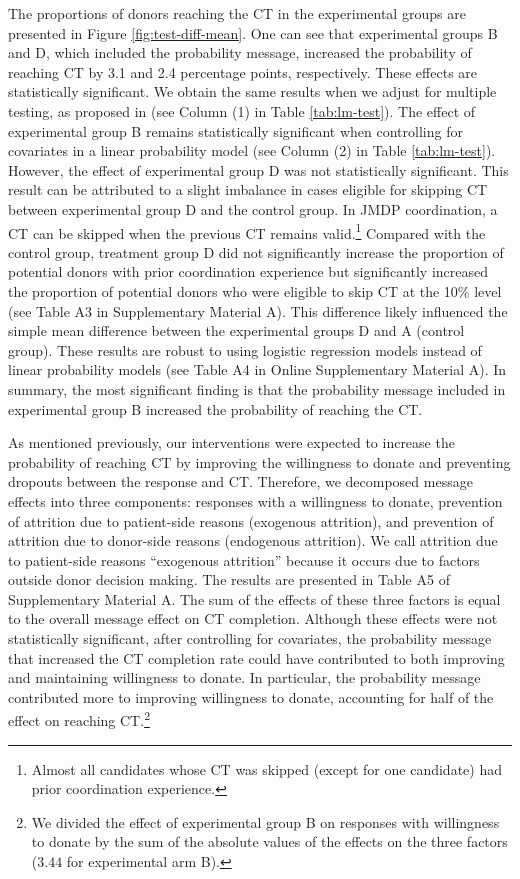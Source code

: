 \documentclass[12pt, a4paper]{article}
\begin{document}
The proportions of donors reaching the CT in the experimental groups are presented in Figure \ref{fig:test-diff-mean}. One can see that experimental groups B and D, which included the probability message, increased the probability of reaching CT by 3.1 and 2.4 percentage points, respectively. These effects are statistically significant. We obtain the same results when we adjust for multiple testing, as proposed in \citet{List2019} (see Column (1) in Table \ref{tab:lm-test}). The effect of experimental group B remains statistically significant when controlling for covariates in a linear probability model (see Column (2) in Table \ref{tab:lm-test}). However, the effect of experimental group D was not statistically significant. This result can be attributed to a slight imbalance in cases eligible for skipping CT between experimental group D and the control group. In JMDP coordination, a CT can be skipped when the previous CT remains valid.\footnote{Almost all candidates whose CT was skipped (except for one candidate) had prior coordination experience.} Compared with the control group, treatment group D did not significantly increase the proportion of potential donors with prior coordination experience but significantly increased the proportion of potential donors who were eligible to skip CT at the 10\% level (see Table A3 in Supplementary Material A). This difference likely influenced the simple mean difference between the experimental groups D and A (control group). These results are robust to using logistic regression models instead of linear probability models (see Table A4 in Online Supplementary Material A). In summary, the most significant finding is that the probability message included in experimental group B increased the probability of reaching the CT.

As mentioned previously, our interventions were expected to increase the probability of reaching CT by improving the willingness to donate and preventing dropouts between the response and CT. Therefore, we decomposed message effects into three components: responses with a willingness to donate, prevention of attrition due to patient-side reasons (exogenous attrition), and prevention of attrition due to donor-side reasons (endogenous attrition). We call attrition due to patient-side reasons ``exogenous attrition'' because it occurs due to factors outside donor decision making. The results are presented in Table A5 of Supplementary Material A. The sum of the effects of these three factors is equal to the overall message effect on CT completion. Although these effects were not statistically significant, after controlling for covariates, the probability message that increased the CT completion rate could have contributed to both improving and maintaining willingness to donate. In particular, the probability message contributed more to improving willingness to donate, accounting for half of the effect on reaching CT.\footnote{We divided the effect of experimental group B on responses with willingness to donate by the sum of the absolute values of the effects on the three factors (\(3.44\) for experimental arm B).}
\end{document}

